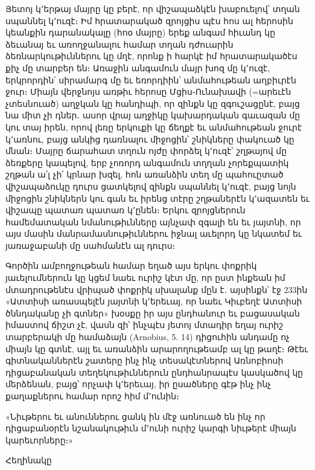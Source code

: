 \documentclass{article}
\begin{document}
{Յետոյ կ՚երթայ մայրը կը բերէ, որ վիշապաձկէն խաբուելով՝ տղան սպաննել կ՚ուզէ։ Իմ հրատարակած զրոյցիս պէս հոս ալ հերոսին կեանքին դարանակալը (հոօ մայրը) երեք անգամ հիւանդ կը ձեւանայ եւ առողջանալու համար տղան դժուարին ձեռնարկութիւններու կը մղէ, որոնք ի հարկէ իմ հրատարակածէս քիչ մը տարբեր են։ Առաջին անգամուն մայր խոզ մը կ՚ուզէ, երկրորդին՝ սիրամարգ մը եւ եռորդիին՝ անմահութեան աղբիւրէն ջուր։ Միայն վերջնոյս առթիւ հերոսը Մցիս֊Ունախավի (=արեւէն չտեսնուած) աղջկան կը հանդիպի, որ զինքն կը զգուշացընէ, բայց նա միտ չի դներ․ ասոր վրայ աղջիկը կախարդական գաւազան մը կու տայ իրեն, որով լեռը երկուքի կը ճեղքէ եւ անմահութեան ջուրէ կ՚առնու, բայց անկից դառնալու միջոցին՝ շնիկները փակուած կը մնան։ Մայրը ճարահատ տղուն ոյժը փորձել կ՚ուզէ՝ շղթայով մը ձեռքերը կապելով, երբ չոռորդ անգամուն տղղան չորեքպատիկ շղթան ա՛լ չի՛ կրնար խզել, հոն առանձին տեղ մը պահուըտած վիշապաձուկը դուրս ցատկելով զինքն սպաննել կ՚ուզէ, բայց նոյն միջոցին շնիկներն կու գան եւ իրենց տէրը շղթաներէն կ՚ազատեն եւ վիշապը պատառ պատառ կ՚ընեն։ Երկու զրոյցներուն համեմատական նմանութիւնները այնչափ զգալի են եւ յայտնի, որ այս մասին մանրամասնութիւններու իջնալ աւելորդ կը նկատեմ եւ յառաջաբանի մը սահմանէն ալ դուրս։

Գործին ամբողջութեան համար եղած այս երկու փոքրիկ յաւելումներուն կը կցեմ նաեւ ուրիշ կէտ մը, որ ըստ ինքեան իմ մտադրութենէս վրիպած փոքրիկ սխալանք մըն է․ այսինքն՝ էջ 233ին «Ատտիսի առասպելէն յայտնի կ՚երեւայ, որ նաեւ Կիւբեղէ Ատտիսի ծննդականը չի գտներ» խօսքը իր այս ընդհանուր եւ բացասական իմաստով ճիշտ չէ, վասն զի՝ ինչպէս յետոյ մտադիր եղայ ուրիշ տարբերակի մը համաձայն (Arnobius, 5. 14) դիցուհին անդամը ոչ միայն կը գտնէ, այլ եւ առանձին արարողութեամբ ալ կը թաղէ։ Թէեւ գիտնականներէն շատերը ինչ ինչ տեսակէտներով Առնոբիոսի դիցաբանական տեղեկութիւններուն ընդհանրապէս կասկածով կը մերձենան, բայց՝ որչափ կ՚երեւայ, իր ըսածները գէթ ինչ ինչ քաղաքներու համար որոշ հիմ մ՚ունին։

«Նիւթերու եւ անուններու ցանկ ին մէջ առնուած են ինչ որ դիցաբանօրէն նշանակութիւն մ՚ունի ուրիշ կարգի նիւթերէ միայն կարեւորները։»

\bigskip

Հեղինակը
}
\clearpage
\section*{}
\normalsize
\end{document}
